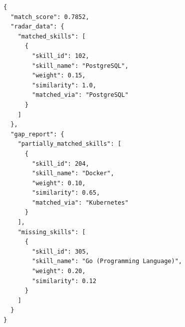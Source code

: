 \begin{lstlisting}[caption=Ví dụ cấu trúc JSON kết quả so khớp (radar\_data và gap\_report), label=lst:code_match_json]
{
  "match_score": 0.7852,
  "radar_data": {
    "matched_skills": [
      {
        "skill_id": 102,
        "skill_name": "PostgreSQL",
        "weight": 0.15,
        "similarity": 1.0,
        "matched_via": "PostgreSQL"
      }
    ]
  },
  "gap_report": {
    "partially_matched_skills": [
      {
        "skill_id": 204,
        "skill_name": "Docker",
        "weight": 0.10,
        "similarity": 0.65,
        "matched_via": "Kubernetes"
      }
    ],
    "missing_skills": [
      {
        "skill_id": 305,
        "skill_name": "Go (Programming Language)",
        "weight": 0.20,
        "similarity": 0.12
      }
    ]
  }
}
\end{lstlisting}
